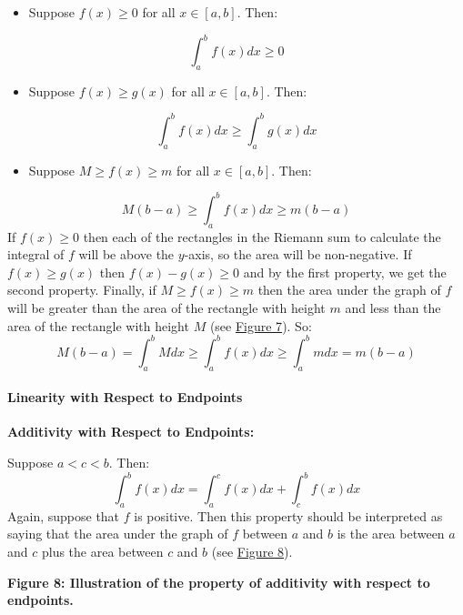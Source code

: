 \begin{itemize}
    \item Suppose $f(x) \ge 0$ for all $x \in [a,b]$. Then:
\end{itemize}
$$
\int_a^b f(x) dx \ge 0
$$
\begin{itemize}
    \item Suppose $f(x) \ge g(x)$ for all $x \in [a,b]$. Then:
\end{itemize}
$$
\int_a^b f(x) dx \ge \int_a^b g(x) dx
$$
\begin{itemize}
    \item Suppose $M \ge f(x) \ge m$ for all $x \in [a,b]$. Then:
\end{itemize}
$$
M(b-a) \ge \int_a^b f(x) dx \ge m(b-a)
$$
If $f(x) \ge 0$ then each of the rectangles in the Riemann sum to calculate the integral of $f$ will be above the $y$-axis, so the area will be non-negative. If $f(x) \ge g(x)$ then $f(x) - g(x) \ge 0$ and by the first property, we get the second property. Finally, if $M \ge f(x) \ge m$ then the area under the graph of $f$ will be greater than the area of the rectangle with height $m$ and less than the area of the rectangle with height $M$ (see \href{https://upload.wikimedia.org/wikipedia/commons/thumb/e/ed/Integral_comparison_1.png/300px-Integral_comparison_1.png}{Figure 7}). So:
$$
M(b-a) = \int_a^b M dx \ge \int_a^b f(x) dx \ge \int_a^b m dx = m(b-a)
$$
\paragraph{Linearity with Respect to Endpoints}



\textbf{Additivity with Respect to Endpoints:}



Suppose $a < c < b$. Then:
$$
\int_a^b f(x) dx = \int_a^c f(x) dx + \int_c^b f(x) dx
$$
Again, suppose that $f$ is positive. Then this property should be interpreted as saying that the area under the graph of $f$ between $a$ and $b$ is the area between $a$ and $c$ plus the area between $c$ and $b$ (see \href{https://upload.wikimedia.org/wikipedia/commons/thumb/1/1c/Integral_linear_endpoints.png/300px-Integral_linear_endpoints.png}{Figure 8}).




\textbf{Figure 8: Illustration of the property of additivity with respect to endpoints.}



